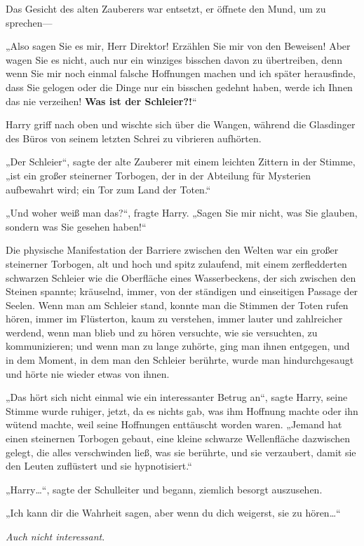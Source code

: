 {Das Gesicht des alten Zauberers war entsetzt, er öffnete den Mund, um zu sprechen—

„Also sagen Sie es mir, Herr Direktor! Erzählen Sie mir von den Beweisen! Aber wagen Sie es nicht, auch nur ein winziges bisschen davon zu übertreiben, denn wenn Sie mir noch einmal falsche Hoffnungen machen und ich später herausfinde, dass Sie gelogen oder die Dinge nur ein bisschen gedehnt haben, werde ich Ihnen das nie verzeihen! \textbf{Was ist der Schleier?!}“

Harry griff nach oben und wischte sich über die Wangen, während die Glasdinger des Büros von seinem letzten Schrei zu vibrieren aufhörten.

„Der Schleier“, sagte der alte Zauberer mit einem leichten Zittern in der Stimme, „ist ein großer steinerner Torbogen, der in der Abteilung für Mysterien aufbewahrt wird; ein Tor zum Land der Toten.“

„Und woher weiß man das?“, fragte Harry. „Sagen Sie mir nicht, was Sie glauben, sondern was Sie gesehen haben!“

Die physische Manifestation der Barriere zwischen den Welten war ein großer steinerner Torbogen, alt und hoch und spitz zulaufend, mit einem zerfledderten schwarzen Schleier wie die Oberfläche eines Wasserbeckens, der sich zwischen den Steinen spannte; kräuselnd, immer, von der ständigen und einseitigen Passage der Seelen. Wenn man am Schleier stand, konnte man die Stimmen der Toten rufen hören, immer im Flüsterton, kaum zu verstehen, immer lauter und zahlreicher werdend, wenn man blieb und zu hören versuchte, wie sie versuchten, zu kommunizieren; und wenn man zu lange zuhörte, ging man ihnen entgegen, und in dem Moment, in dem man den Schleier berührte, wurde man hindurchgesaugt und hörte nie wieder etwas von ihnen.

„Das hört sich nicht einmal wie ein interessanter Betrug an“, sagte Harry, seine Stimme wurde ruhiger, jetzt, da es nichts gab, was ihm Hoffnung machte oder ihn wütend machte, weil seine Hoffnungen enttäuscht worden waren. „Jemand hat einen steinernen Torbogen gebaut, eine kleine schwarze Wellenfläche dazwischen gelegt, die alles verschwinden ließ, was sie berührte, und sie verzaubert, damit sie den Leuten zuflüstert und sie hypnotisiert.“

„Harry…“, sagte der Schulleiter und begann, ziemlich besorgt auszusehen.

„Ich kann dir die Wahrheit sagen, aber wenn du dich weigerst, sie zu hören…“

\emph{Auch nicht interessant}.

}
